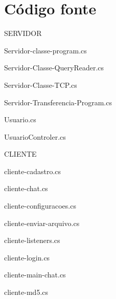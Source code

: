 
\section{Código fonte}

{\LARGE SERVIDOR}

{\large Servidor-classe-program.cs}
{\scriptsize  }

{\large Servidor-Classe-QueryReader.cs}
{\scriptsize  }

{\large Servidor-Classe-TCP.cs}
{\scriptsize  }


{\large Servidor-Transferencia-Program.cs}
{\scriptsize  }

{\large Usuario.cs}
{\scriptsize  }

{\large UsuarioControler.cs}
{\scriptsize  }


{\LARGE CLIENTE}

{\large cliente-cadastro.cs}
{\scriptsize  }

{\large cliente-chat.cs}
{\scriptsize  }

{\large cliente-configuracoes.cs}
{\scriptsize  }

{\large cliente-enviar-arquivo.cs}
{\scriptsize  }

{\large cliente-listeners.cs}
{\scriptsize  }

{\large cliente-login.cs}
{\scriptsize  }

{\large cliente-main-chat.cs}
{\scriptsize  }

{\large cliente-md5.cs}
{\scriptsize  }

